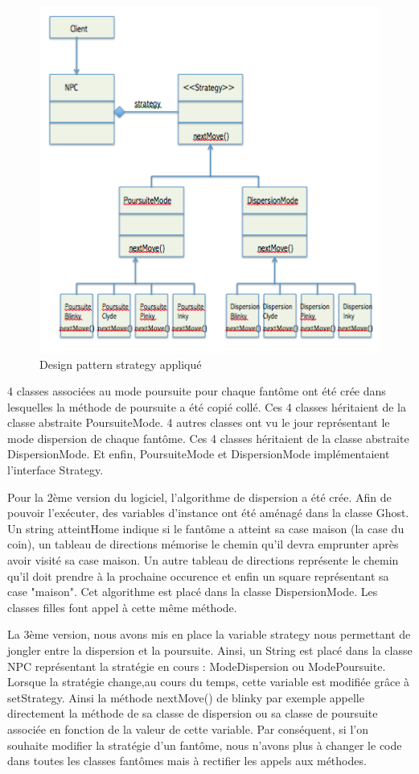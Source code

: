 \documentclass[a4paper,12pt]{report} %
\begin{document}
\begin{figure}[!h] %
		\centering
		\includegraphics[scale=0.9]{ressources/StrategyDP.png}
		\caption{Design pattern strategy appliqué}\label{figure3}
\end{figure}


4 classes associées au mode poursuite pour chaque fantôme ont été crée dans lesquelles la méthode de poursuite a été copié collé. Ces 4 classes héritaient de la classe abstraite PoursuiteMode.
4 autres classes ont vu le jour représentant le mode dispersion de chaque fantôme.
Ces 4 classes héritaient de la classe abstraite DispersionMode.
Et enfin, PoursuiteMode et DispersionMode implémentaient l'interface Strategy.

Pour la 2ème version du logiciel, l'algorithme de dispersion a été crée.
Afin de pouvoir l'exécuter, des variables d'instance ont été aménagé dans la classe Ghost. Un string atteintHome indique si le fantôme a atteint sa case maison (la case du coin), un tableau de directions mémorise le chemin qu'il devra emprunter après avoir visité sa case maison. Un autre tableau de directions représente le chemin qu'il doit prendre à la prochaine occurence et enfin un square représentant sa case "maison".
Cet algorithme est placé dans la classe DispersionMode. Les classes filles font appel à cette même méthode.

La 3ème version, nous avons mis en place la variable strategy nous permettant de jongler entre la dispersion et la poursuite.
Ainsi, un String est placé dans la classe NPC représentant la stratégie en cours : ModeDispersion ou ModePoursuite. Lorsque la stratégie change,au cours du temps, cette variable est modifiée grâce à setStrategy.
Ainsi la méthode nextMove() de blinky par exemple appelle directement la méthode de sa classe de dispersion ou sa classe de poursuite associée en fonction de la valeur de cette variable.
Par conséquent, si l'on souhaite modifier la stratégie d'un fantôme, nous n'avons plus à changer le code dans toutes les classes fantômes mais à rectifier les appels aux méthodes.
\end{document}
